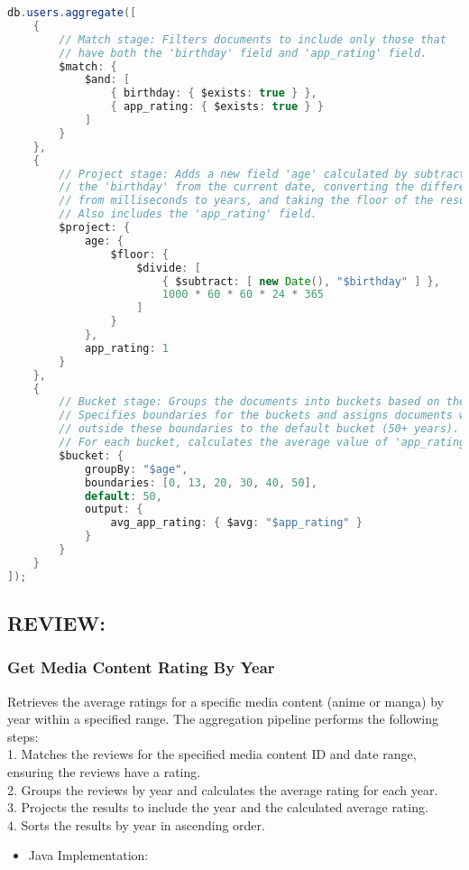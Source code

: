 \begin{mdframed}[style=customstyle2]
\begin{lstlisting}[language=java, backgroundcolor=\color{white}]
db.users.aggregate([
    { 
        // Match stage: Filters documents to include only those that 
        // have both the 'birthday' field and 'app_rating' field.
        $match: { 
            $and: [
                { birthday: { $exists: true } }, 
                { app_rating: { $exists: true } }
            ]
        } 
    },
    { 
        // Project stage: Adds a new field 'age' calculated by subtracting 
        // the 'birthday' from the current date, converting the difference 
        // from milliseconds to years, and taking the floor of the result.
        // Also includes the 'app_rating' field.
        $project: { 
            age: { 
                $floor: { 
                    $divide: [
                        { $subtract: [ new Date(), "$birthday" ] },
                        1000 * 60 * 60 * 24 * 365
                    ]
                }
            },
            app_rating: 1 
        } 
    },
    { 
        // Bucket stage: Groups the documents into buckets based on the 'age' field.
        // Specifies boundaries for the buckets and assigns documents with an age 
        // outside these boundaries to the default bucket (50+ years).
        // For each bucket, calculates the average value of 'app_rating'.
        $bucket: {
            groupBy: "$age",
            boundaries: [0, 13, 20, 30, 40, 50],
            default: 50,
            output: { 
                avg_app_rating: { $avg: "$app_rating" }
            }
        }
    }
]);\end{lstlisting}
\end{mdframed}

\newpage

\subsection*{REVIEW:}

\subsubsection*{Get Media Content Rating By Year}

Retrieves the average ratings for a specific media content (anime or manga) by year within a specified range.
The aggregation pipeline performs the following steps:\\
1. Matches the reviews for the specified media content ID and date range, ensuring the reviews have a rating.\\
2. Groups the reviews by year and calculates the average rating for each year.\\
3. Projects the results to include the year and the calculated average rating.\\
4. Sorts the results by year in ascending order.
\begin{itemize}
    \item Java Implementation:
\end{itemize}

